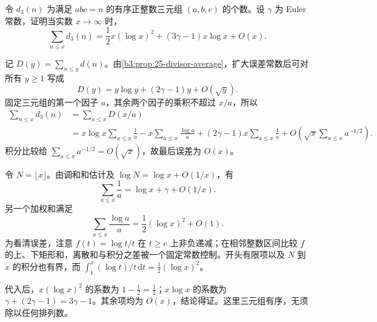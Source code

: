 \begin{exercise}\label{b3:ex:25-2}
令 \(d_3(n)\) 为满足 \(abc=n\) 的有序正整数三元组 \((a,b,c)\) 的个数。设 \(\gamma\) 为 Euler 常数，证明当实数 \(x\to\infty\) 时，
\[
 \sum_{n\le x}d_3(n)
 =\frac12x(\log x)^2+(3\gamma-1)x\log x+O(x).
\]
\end{exercise}
\begin{solution}
记 \(D(y)=\sum_{n\le y}d(n)\)。由\cref{b3:prop:25-divisor-average}，扩大误差常数后可对所有 \(y\ge1\) 写成
\[
 D(y)=y\log y+(2\gamma-1)y+O(\sqrt y).
\]
固定三元组的第一个因子 \(a\)，其余两个因子的乘积不超过 \(x/a\)，所以
\[
 \begin{aligned}
 \sum_{n\le x}d_3(n)
 &=\sum_{a\le x}D(x/a)\\
 &=x\log x\sum_{a\le x}\frac1a
   -x\sum_{a\le x}\frac{\log a}{a}
   +(2\gamma-1)x\sum_{a\le x}\frac1a
   +O\left(\sqrt x\sum_{a\le x}a^{-1/2}\right).
 \end{aligned}
\]
积分比较给 \(\sum_{a\le x}a^{-1/2}=O(\sqrt x)\)，故最后误差为 \(O(x)\)。

令 \(N=\lfloor x\rfloor\)。由调和和估计及 \(\log N=\log x+O(1/x)\)，有
\[
 \sum_{a\le x}\frac1a=\log x+\gamma+O(1/x).
\]
另一个加权和满足
\[
 \sum_{a\le x}\frac{\log a}{a}
 =\frac12(\log x)^2+O(1).
\]
为看清误差，注意 \(f(t)=\log t/t\) 在 \(t\ge e\) 上非负递减；在相邻整数区间比较 \(f\) 的上、下矩形和，离散和与积分之差被一个固定常数控制。开头有限项以及 \(N\) 到 \(x\) 的积分也有界，而 \(\int_1^x(\log t)/t\,\mathrm dt=\tfrac12(\log x)^2\)。

代入后，\(x(\log x)^2\) 的系数为 \(1-\tfrac12=\tfrac12\)；\(x\log x\) 的系数为 \(\gamma+(2\gamma-1)=3\gamma-1\)。其余项均为 \(O(x)\)，结论得证。这里三元组有序，无须除以任何排列数。
\end{solution}

